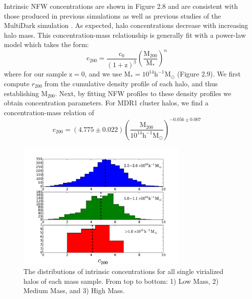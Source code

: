 Intrinsic NFW concentrations are shown in Figure 2.8 and are consistent
with those produced in previous simulations as well as previous
studies of the MultiDark simulation \citep{PradaEtAl2012}.  As expected, halo
concentrations decrease with increasing halo mass. This
concentration-mass relationship is generally fit with a power-law model which
takes the form:  
\begin{equation}
\mathrm{c_{200} = \frac{c_{0}}{\left( 1+z \right)^{\beta}} \left( \frac{\mathrm{M}_{200}}{\mathrm{M}_{*}} \right)^{\alpha}}
\end{equation}
where for our sample $\mathrm{z=0}$, and we use M$_{*}= 10^{14} \mathrm{h}^{-1}
$M$_{\odot}$ (Figure 2.9). We first compute $r_{200}$ from the
cumulative density profile of each halo, and thus establishing  
M$_{200}$. Next, by fitting NFW profiles to these density profiles we
obtain concentration parameters. For MDR1 cluster halos, we find a
concentration-mass relation of  
\begin{equation}
\mathrm{c_{200} = \left( 4.775 \pm 0.022 \right) \left( \frac{\mathrm{M}_{200}}{10^{14} \mathrm{h}^{-1}
    \mathrm{M}_{\odot}} \right)^{-0.056 \pm 0.007}}
\end{equation}

\begin{figure}
 \centering
 \includegraphics[width=0.75\textwidth]{images/ClusterProjectionProject/SingleVirialConcs.pdf}
\caption[MDR1 Intrinsic Concentration Parameters]{The distributions of intrinsic concentrations for all single virialized halos of each mass sample. From top to bottom: 1) Low Mass, 2) Medium Mass, and 3) High Mass.}
\end{figure}

